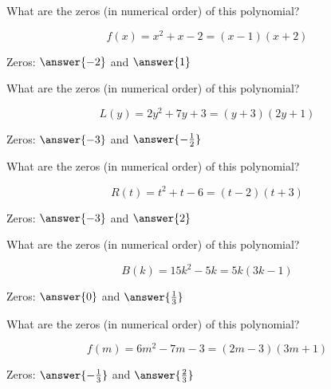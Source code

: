 \documentclass{ximera}
\author{Lee Wayand}
\begin{document}
\begin{example}








\begin{question}


What are the zeros (in numerical order) of this polynomial?

\[
f(x) = x^2 + x - 2 = (x-1)(x+2)
\]


Zeros:  $\answer{-2}$ and $\answer{1}$

\end{question}





\begin{question}


What are the zeros (in numerical order) of this polynomial?

\[
L(y) = 2y^2 + 7y + 3 = (y+3)(2y+1)
\]

Zeros:  $\answer{-3}$ and $\answer{-\frac{1}{2}}$

\end{question}





\begin{question}


What are the zeros (in numerical order) of this polynomial?

\[
R(t) = t^2 + t - 6 = (t-2)(t+3)
\]

Zeros:  $\answer{-3}$ and $\answer{2}$

\end{question}





\begin{question}


What are the zeros (in numerical order) of this polynomial?

\[
B(k) = 15k^2 - 5k = 5k (3k - 1)
\]

Zeros:  $\answer{0}$ and $\answer{\frac{1}{3}}$

\end{question}








\begin{question}


What are the zeros (in numerical order) of this polynomial?

\[
f(m) = 6m^2 -7m - 3 = (2m - 3)(3m + 1)
\]

Zeros:  $\answer{-\frac{1}{3}}$ and $\answer{\frac{2}{3}}$

\end{question}












\end{example}
\end{document}
